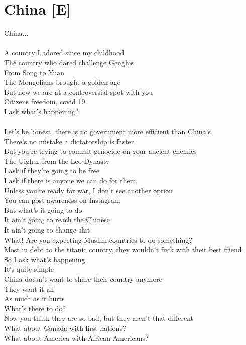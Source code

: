\documentclass[12pt, b5paper, oneside]{book}
\begin{document}
\section{China [E]}
China...
%
\\\\A country I adored since my childhood
\\The country who dared challenge Genghis
\\From Song to Yuan
\\The Mongolians brought a golden age
\\But now we are at a controversial spot with you
\\Citizens freedom, covid 19
\\I ask what's happening?
%
\\\\Let's be honest, there is no government more efficient than China's
\\There's no mistake a dictatorship is faster
\\But you're trying to commit genocide on your ancient enemies
\\The Uighur from the Leo Dynasty
\\I ask if they're going to be free
\\I ask if there is anyone we can do for them
\\Unless you're ready for war, I don't see another option
\\You can post awareness on Instagram
\\But what's it going to do
\\It ain't going to reach the Chinese
\\It ain't going to change shit
\\What! Are you expecting Muslim countries to do something?
\\Most in debt to the titanic country, they wouldn't fuck with their best friend
\\So I ask what's happening
\\It's quite simple
\\China doesn't want to share their country anymore
\\They want it all
\\As much as it hurts
\\What's there to do?
\\Now you think they are so bad, but they aren't that different
\\What about Canada with first nations?
\\What about America with African-Americans?
\end{document}
